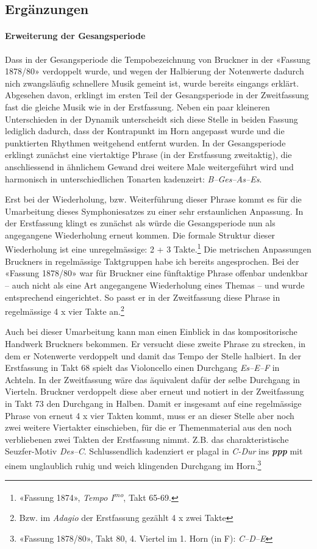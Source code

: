 \subsection{Ergänzungen}

\paragraph{Erweiterung der Gesangsperiode}

Dass in der Gesangsperiode die Tempobezeichnung von Bruckner in der «Fassung 1878/80» verdoppelt wurde, und wegen der Halbierung der Notenwerte dadurch nich zwangsläufig schnellere Musik gemeint ist, wurde bereits eingangs erklärt.
Abgesehen davon, erklingt im ersten Teil der Gesangsperiode in der Zweitfassung fast die gleiche Musik wie in der Erstfassung.
Neben ein paar kleineren Unterschieden in der Dynamik unterscheidt sich diese Stelle in beiden Fassung lediglich dadurch, dass der Kontrapunkt im Horn angepasst wurde und die punktierten Rhythmen weitgehend entfernt wurden.
In der Gesangsperiode erklingt zunächst eine viertaktige Phrase (in der Erstfassung zweitaktig), die anschliessend in ähnlichem Gewand drei weitere Male weitergeführt wird und harmonisch in unterschiedlichen Tonarten kadenzeirt: \emph{B--Ges--As--Es}.

Erst bei der Wiederholung, bzw. Weiterführung dieser Phrase kommt es für die Umarbeitung dieses Symphoniesatzes zu einer sehr erstaunlichen Anpassung.
In der Erstfassung klingt es zunächst als würde die Gesangsperiode nun als angegangene Wiederholung erneut kommen.
Die formale Struktur dieser Wiederholung ist eine unregelmässige: 2 + 3 Takte.\footnote{«Fassung 1874», \emph{Tempo I\textsuperscript{mo}}, Takt 65-69.}
Die metrischen Anpassungen Bruckners in regelmässige Taktgruppen habe ich bereits angesprochen.
Bei der «Fassung 1878/80» war für Bruckner eine fünftaktige Phrase offenbar undenkbar – auch nicht als eine Art angegangene Wiederholung eines Themas – und wurde entsprechend eingerichtet.
So passt er in der Zweitfassung diese Phrase in regelmässige 4 x vier Takte an.\footnote{Bzw. im \emph{Adagio} der Erstfassung gezählt 4 x zwei Takte}

Auch bei dieser Umarbeitung kann man einen Einblick in das kompositorische Handwerk Bruckners bekommen.
Er versucht diese zweite Phrase zu strecken, in dem er Notenwerte verdoppelt und damit das Tempo der Stelle halbiert.
In der Erstfassung in Takt 68 spielt das Violoncello einen Durchgang \emph{Es--E--F} in Achteln.
In der Zweitfassung wäre das äquivalent dafür der selbe Durchgang in Vierteln.
Bruckner verdoppelt diese aber erneut und notiert in der Zweitfassung in Takt 73 den Durchgang in Halben.
Damit er insgesamt auf eine regelmässige Phrase von erneut 4 x vier Takten kommt, muss er an dieser Stelle aber noch zwei weitere Viertakter einschieben, für die er Themenmaterial aus den noch verbliebenen zwei Takten der Erstfassung nimmt.
Z.B. das charakteristische Seuzfer-Motiv \emph{Des--C}.
Schlussendlich kadenziert er plagal in \emph{C-Dur} ins \textbf{\emph{ppp}} mit einem unglaublich ruhig und weich klingenden Durchgang im Horn.\footnote{«Fassung 1878/80», Takt 80, 4. Viertel im 1. Horn (in F): \emph{C--D--E}}



